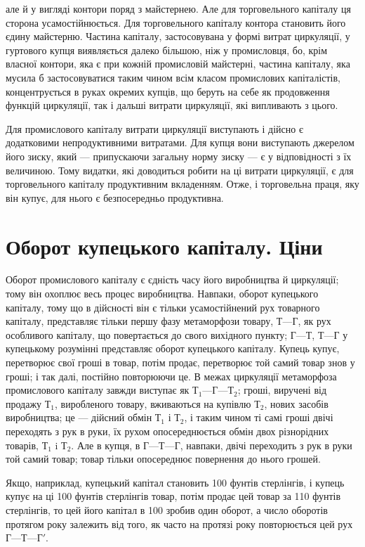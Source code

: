 \parcont{}  %
але й у вигляді контори поряд з майстернею. Але для торговельного
капіталу ця сторона усамостійнюється. Для торговельного
капіталу контора становить його єдину майстерню. Частина
капіталу, застосовувана у формі витрат циркуляції, у гуртового
купця виявляється далеко більшою, ніж у промисловця, бо, крім
власної контори, яка є при кожній промисловій майстерні, частина
капіталу, яка мусила б застосовуватися таким чином всім
класом промислових капіталістів, концентрується в руках окремих
купців, що беруть на себе як продовження функцій циркуляції,
так і дальші витрати циркуляції, які випливають з цього.

Для промислового капіталу витрати циркуляції виступають
і дійсно є додатковими непродуктивними витратами. Для купця
вони виступають джерелом його зиску, який — припускаючи загальну
норму зиску — є у відповідності з їх величиною. Тому
видатки, які доводиться робити на ці витрати циркуляції, є для
торговельного капіталу продуктивним вкладенням. Отже, і торговельна
праця, яку він купує, для нього є безпосередньо
продуктивна.

\section{Оборот купецького капіталу. Ціни}

Оборот промислового капіталу є єдність часу його виробництва
й циркуляції; тому він охоплює весь процес виробництва.
Навпаки, оборот купецького капіталу, тому що в дійсності
він є тільки усамостійнений рух товарного капіталу, представляє
тільки першу фазу метаморфози товару, $Т — Г$, як рух
особливого капіталу, що повертається до свого вихідного пункту;
$Г — Т$, $Т — Г$ у купецькому розумінні представляє оборот купецького
капіталу. Купець купує, перетворює свої гроші в товар, потім
продає, перетворює той самий товар знов у гроші; і так далі,
постійно повторюючи це. В межах циркуляції метаморфоза промислового
капіталу завжди виступає як $Т_1 — Г — Т_2$; гроші, виручені
від продажу $Т_1$, виробленого товару, вживаються на
купівлю $Т_2$, нових засобів виробництва; це — дійсний обмін $Т_1$
і $Т_2$, і таким чином ті самі гроші двічі переходять з рук в руки,
їх рухом опосереднюється обмін двох різнорідних товарів, $Т_1$ i $Т_2$.
Але в купця, в $Г — Т — Г$, навпаки, двічі переходить з рук
в руки той самий товар; товар тільки опосереднює повернення
до нього грошей.

Якщо, наприклад, купецький капітал становить 100 фунтів
стерлінгів, і купець купує на ці 100 фунтів стерлінгів товар,
потім продає цей товар за 110 фунтів стерлінгів, то цей його
капітал в 100 зробив один оборот, а число оборотів протягом
року залежить від того, як часто на протязі року повторюється
цей рух $Г — Т — Г'$.
